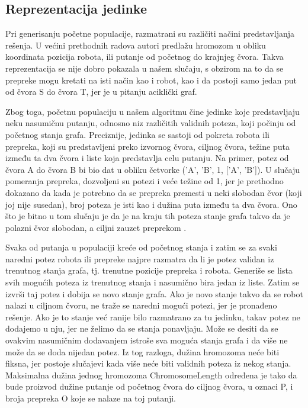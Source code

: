 \documentclass[12pt]{article}
\begin{document}
	\subsection{Reprezentacija jedinke}
	\label{subsec:podnaslov1}
	Pri generisanju početne populacije, razmatrani su različiti načini predstavljanja rešenja. U većini prethodnih radova autori predlažu hromozom u obliku koordinata pozicija robota, ili putanje od početnog do krajnjeg čvora. 
	Takva reprezentacija se nije dobro pokazala u našem slučaju, s obzirom na to da se prepreke mogu kretati na isti način kao i robot, kao i da postoji samo jedan put od čvora S do čvora T, jer je u pitanju aciklički graf.
	\par Zbog toga, početnu populaciju u našem algoritmu čine jedinke koje predstavljaju neku nasumičnu putanju, odnosno niz različitih validnih poteza, koji počinju od početnog stanja grafa. Preciznije, jedinka se sastoji od pokreta robota ili prepreka, koji su predstavljeni preko izvornog čvora, ciljnog čvora, težine puta između ta dva čvora i liste koja predstavlja celu putanju. Na primer, potez od čvora A do čvora B bi bio dat u obliku četvorke ('A', 'B', 1, ['A', 'B']). U slučaju pomeranja prepreka, dozvoljeni su potezi i veće težine od 1, jer je prethodno dokazano da kada je potrebno da se prepreka premesti u neki slobodan čvor (koji joj nije susedan), broj poteza je isti kao i dužina puta između ta dva čvora. Ono što je bitno u tom slučaju je da je na kraju tih poteza stanje grafa takvo da je polazni čvor slobodan, a ciljni zauzet preprekom \cite{glavni}.
	\par Svaka od putanja u populaciji kreće od početnog stanja i zatim se za svaki naredni potez robota ili prepreke najpre razmatra da li je potez validan iz trenutnog stanja grafa, tj. trenutne pozicije prepreka i robota. Generiše se lista svih mogućih poteza iz trenutnog stanja i nasumično bira jedan iz liste. Zatim se izvrši taj potez i dobija se novo stanje grafa. Ako je novo stanje takvo da se robot nalazi u ciljnom čvoru, ne traže se naredni mogući potezi, jer je pronađeno rešenje. Ako je to stanje već ranije bilo razmatrano za tu jedinku, takav potez ne dodajemo u nju, jer ne želimo da se stanja ponavljaju. Može se desiti da se ovakvim nasumičnim dodavanjem istroše sva moguća stanja grafa i da više ne može da se doda nijedan potez.
	Iz tog razloga, dužina hromozoma neće biti fiksna, jer postoje slučajevi kada više neće biti validnih poteza iz nekog stanja. Maksimalna dužina jednog hromozoma ChromosomeLength određena je tako da bude proizvod dužine putanje od početnog čvora do ciljnog čvora, u oznaci P, i broja prepreka O koje se nalaze na toj putanji. \newline
	
\end{document}
